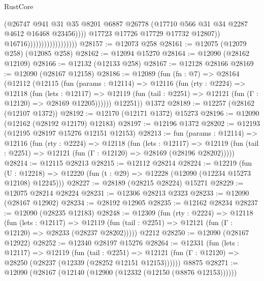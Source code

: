 \begin{lexlean}{RustCore}
\begin{coremodule}
                                                (@26747
                                                  @941
                                                  @31
                                                  @35
                                                  @8201
                                                  @6887
                                                  @26778
                                                  (@17710 @566 @31 @34 @2287 @4612 @16468 @23456))))
                                            @17723
                                            @17726
                                            @17729
                                            @17732
                                            @12807))
                                        @16716))))))))))))))))))
@28157 := @12073 @258
@28161 := @12075 (@12079 @258) (@12085 @258)
@28162 := @12094 @15270
@28164 := @12090 (@28162 @12109)
@28166 := @12132 (@12133 @258)
@28167 := @12128 @28166
@28169 := @12090 (@28167 @12158)
@28186 := @12089
    (fun (fn : @7) =>
    @28164
      (@12112
        (@12115
          (fun (params : @12114) =>
          @12116
            (fun (rty : @2224) =>
            @12118
              (fun (lets : @12117) =>
              @12119 (fun (tail : @2251) => @12121 (fun (Γ : @12120) => @28169 @12205))))))
        @12251))
    @1372
@28189 := @12257 (@28162 (@12107 @1372))
@28192 := @12170 (@12171 @1372) @15273
@28196 := @12090 (@12162 (@28192 @12179) @12183)
@28197 := @12196 @1372
@28202 := @12193 (@12195 @28197 @15276 @12151 @12153)
@28213 := fun (params : @12114) =>
  @12116
    (fun (rty : @2224) =>
    @12118
      (fun (lets : @12117) =>
      @12119 (fun (tail : @2251) => @12121 (fun (Γ : @12120) => @28169 (@28196 @28202)))))
@28214 := @12115 @28213
@28215 := @12112 @28214
@28224 := @12219
    (fun (U : @12218) => @12220 (fun (t : @29) => @12228 (@12090 (@12234 @15273 @12108) @12245)))
@28227 := @28189 (@28215 @28224) @15271
@28229 := @12075 @28214 @28224
@28231 := @12306 @28213 @2323
@28233 := @12090 (@28167 @12902)
@28234 := @28192 @12905
@28235 := @12162 @28234
@28237 := @12090 (@28235 @12183)
@28248 := @12309
    (fun (rty : @2224) =>
    @12118
      (fun (lets : @12117) =>
      @12119 (fun (tail : @2251) => @12121 (fun (Γ : @12120) => @28233 (@28237 @28202)))))
    @2212
@28250 := @12090 (@28167 @12922)
@28252 := @12340 @28197 @15276
@28264 := @12331
    (fun (lets : @12117) =>
    @12119
      (fun (tail : @2251) =>
      @12121 (fun (Γ : @12120) => @28250 (@28237 (@12339 (@28252 @12151 @12153))))))
    @8875
@28271 := @12090 (@28167 (@12140 (@12900 (@12332 (@12150 (@8876 @12153))))))

\end{coremodule}
\end{lexlean}

